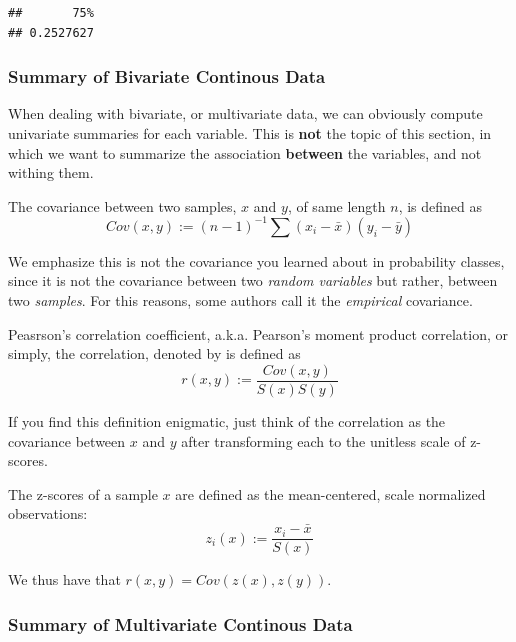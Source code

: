 \documentclass[]{book}
\theoremstyle{definition}
\theoremstyle{definition}
\theoremstyle{remark}
\let\BeginKnitrBlock\begin \let\EndKnitrBlock\end
\begin{document}
\begin{verbatim}
##       75% 
## 0.2527627
\end{verbatim}

\subsubsection{Summary of Bivariate Continous
Data}\label{summary-of-bivariate-continous-data}

When dealing with bivariate, or multivariate data, we can obviously
compute univariate summaries for each variable. This is \textbf{not} the
topic of this section, in which we want to summarize the association
\textbf{between} the variables, and not withing them.

\BeginKnitrBlock{definition}
\protect\hypertarget{def:unnamed-chunk-74}{}{\label{def:unnamed-chunk-74}}The
covariance between two samples, \(x\) and \(y\), of same length \(n\),
is defined as \[Cov(x,y):= (n-1)^{-1} \sum (x_i-\bar x)(y_i-\bar y)  \]
\EndKnitrBlock{definition}

We emphasize this is not the covariance you learned about in probability
classes, since it is not the covariance between two \emph{random
variables} but rather, between two \emph{samples}. For this reasons,
some authors call it the \emph{empirical} covariance.

\BeginKnitrBlock{definition}
\protect\hypertarget{def:unnamed-chunk-75}{}{\label{def:unnamed-chunk-75}}Peasrson's
correlation coefficient, a.k.a. Pearson's moment product correlation, or
simply, the correlation, denoted by is defined as
\[r(x,y):=\frac{Cov(x,y)}{S(x)S(y)} \]
\EndKnitrBlock{definition}

If you find this definition enigmatic, just think of the correlation as
the covariance between \(x\) and \(y\) after transforming each to the
unitless scale of z-scores.

\BeginKnitrBlock{definition}
\protect\hypertarget{def:unnamed-chunk-76}{}{\label{def:unnamed-chunk-76}}The
z-scores of a sample \(x\) are defined as the mean-centered, scale
normalized observations: \[z_i(x):= \frac{x_i-\bar x}{S(x)}\]
\EndKnitrBlock{definition}

We thus have that \(r(x,y)=Cov(z(x),z(y))\).

\subsubsection{Summary of Multivariate Continous
Data}\label{summary-of-multivariate-continous-data}
\end{document}
